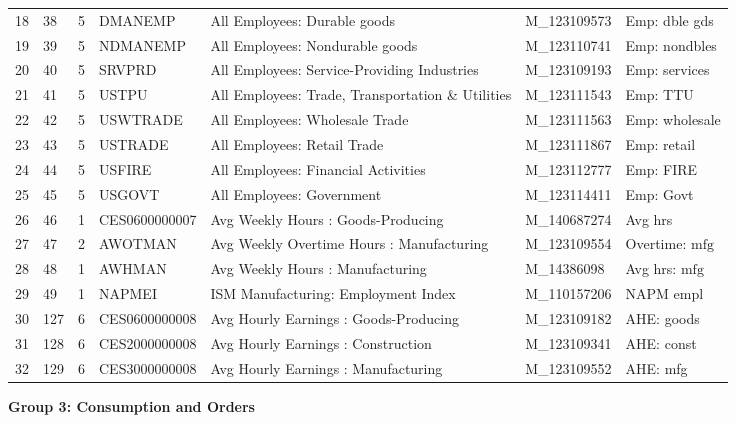 \begin{landscape}
\begin{singlespace}
\begin{longtable}{rlrllll}
 18 & 38 & 5 & DMANEMP & All Employees: Durable goods & M\_123109573 & Emp: dble gds \\
 19 & 39 & 5 & NDMANEMP & All Employees: Nondurable goods & M\_123110741 & Emp: nondbles \\
 20 & 40 & 5 & SRVPRD & All Employees: Service-Providing Industries & M\_123109193 & Emp: services \\
 21 & 41 & 5 & USTPU & All Employees: Trade, Transportation \& Utilities & M\_123111543 & Emp: TTU \\
 22 & 42 & 5 & USWTRADE & All Employees: Wholesale Trade & M\_123111563 & Emp: wholesale \\
 23 & 43 & 5 & USTRADE & All Employees: Retail Trade & M\_123111867 & Emp: retail \\
 24 & 44 & 5 & USFIRE & All Employees: Financial Activities & M\_123112777 & Emp: FIRE \\
 25 & 45 & 5 & USGOVT & All Employees: Government & M\_123114411 & Emp: Govt \\
 26 & 46 & 1 & CES0600000007 & Avg Weekly Hours : Goods-Producing & M\_140687274 & Avg hrs \\
 27 & 47 & 2 & AWOTMAN & Avg Weekly Overtime Hours : Manufacturing & M\_123109554 & Overtime: $\mathrm{mfg}$ \\
 28 & 48 & 1 & AWHMAN & Avg Weekly Hours : Manufacturing & M\_14386098 & Avg hrs: $\mathrm{mfg}$ \\
 29 & 49 & 1 & NAPMEI & ISM Manufacturing: Employment Index & M\_110157206 & NAPM empl \\
 30 & 127 & 6 & CES0600000008 & Avg Hourly Earnings : Goods-Producing & M\_123109182 & AHE: goods \\
 31 & 128 & 6 & CES2000000008 & Avg Hourly Earnings : Construction & M\_123109341 & AHE: const \\
 32 & 129 & 6 & CES3000000008 & Avg Hourly Earnings : Manufacturing & M\_123109552 & AHE: mfg \\
\hline
\end{longtable}


\begin{center}
   \textbf{Group 3: Consumption and Orders}
\end{center}


\end{singlespace}
\end{landscape}
